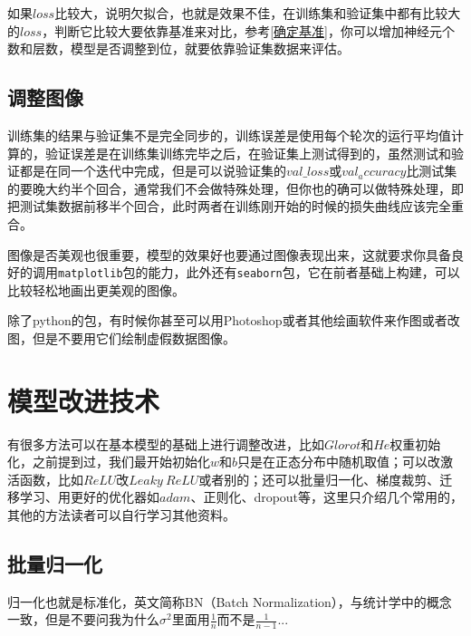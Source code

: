 \documentclass[a5paper, 11pt]{ctexbook}
\begin{document}
如果$loss$比较大，说明欠拟合，也就是效果不佳，在训练集和验证集中都有比较大的$loss$，判断它比较大要依靠基准来对比，参考\ref{确定基准}，你可以增加神经元个数和层数，模型是否调整到位，就要依靠验证集数据来评估。


\section{调整图像}

训练集的结果与验证集不是完全同步的，训练误差是使用每个轮次的运行平均值计算的，验证误差是在训练集训练完毕之后，在验证集上测试得到的，虽然测试和验证都是在同一个迭代中完成，但是可以说验证集的$val\_loss$或$val_accuracy$比测试集的要晚大约半个回合，通常我们不会做特殊处理，但你也的确可以做特殊处理，即把测试集数据前移半个回合，此时两者在训练刚开始的时候的损失曲线应该完全重合。


\begin{sloppypar}
    图像是否美观也很重要，模型的效果好也要通过图像表现出来，这就要求你具备良好的调用\verb|matplotlib|包的能力，此外还有\verb|seaborn|包，它在前者基础上构建，可以比较轻松地画出更美观的图像。
\end{sloppypar}

除了python的包，有时候你甚至可以用Photoshop或者其他绘画软件来作图或者改图，但是不要用它们绘制虚假数据图像。


\chapter{模型改进技术}


\begin{sloppypar}
    有很多方法可以在基本模型的基础上进行调整改进，比如$Glorot$和$He$权重初始化\label{权重初始化}，之前提到过，我们最开始初始化$w$和$b$只是在正态分布中随机取值；可以改激活函数，比如$ReLU$改$Leaky~ReLU$或者别的；还可以批量归一化、梯度裁剪、迁移学习、用更好的优化器如$adam$、正则化、dropout等，这里只介绍几个常用的，其他的方法读者可以自行学习其他资料。
\end{sloppypar}

\section{批量归一化}

归一化也就是标准化，英文简称BN（Batch Normalization），与统计学中的概念一致，但是不要问我为什么$\sigma^2$里面用$\frac{1}{n}$而不是$\frac{1}{n-1}$...
\end{document}
